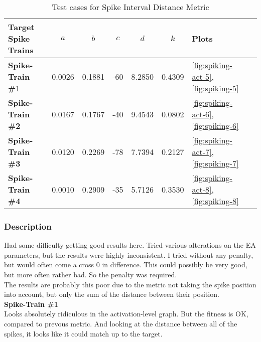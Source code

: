 \begin{table}[H]
	\begin{center}
		\begin{tabular}{ | l | c | c | c | c | c | l | l |}
	
	    \hline

			\textbf{Target Spike Trains} & \textbf{$a$} & \textbf{$b$} & \textbf{$c$} & \textbf{$d$} & \textbf{$k$} & \textbf{Plots}  \\ \hline 
			\textbf{Spike-Train \#}1 & 0.0026 & 0.1881 & -60 & 8.2850 & 0.4309 & \autoref{fig:spiking-act-5}, \autoref{fig:spiking-5} \\ \hline 
			\textbf{Spike-Train \#2} & 0.0167 & 0.1767 & -40 & 9.4543 & 0.0802 & \autoref{fig:spiking-act-6}, \autoref{fig:spiking-6} \\ \hline 
			\textbf{Spike-Train \#3} & 0.0120 & 0.2269 & -78 & 7.7394 & 0.2127 & \autoref{fig:spiking-act-7}, \autoref{fig:spiking-7} \\ \hline 
			\textbf{Spike-Train \#4} & 0.0010 & 0.2909 & -35 & 5.7126 & 0.3530 & \autoref{fig:spiking-act-8}, \autoref{fig:spiking-8}    \\ \hline 

	    \end{tabular}
	
	\end{center}
    \caption{Test cases for Spike Interval Distance Metric}
\end{table}

\subsubsection{Description}

Had some difficulty getting good results here. Tried various alterations on the EA parameters,
but the results were highly inconsistent. I tried without any penalty, but would often come
a cross 0 in difference. This could possibly be very good, but more often rather bad. So the penalty
was required. \\

The results are probably this poor due to the metric not taking the spike position into account, but
only the sum of the distance between their position. \\

\textbf{Spike-Train \#1} \\
Looks absolutely ridiculous in the activation-level graph. But the fitness is OK, compared to prevous metric. 
And looking at the distance between all of the spikes, it looks like it could match up to the target. \\

